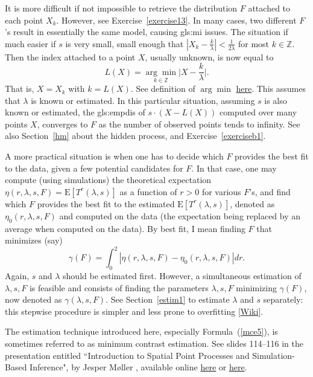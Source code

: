 \documentclass[10pt]{article}
\begin{document}
It is more difficult if not impossible to retrieve the distribution $F$ attached to each point $X_k$. However, see Exercise~\ref{exercise13}. In many cases,
two different $F$'s result in essentially the same model, causing \gls{gls:mi} issues.
The situation if much easier if $s$ is very small, small enough that $|X_k - \frac{k}{\lambda}| < \frac{1}{2\lambda}$ for most $k\in\mathbb{Z}$.
Then the index attached to a point $X$, usually unknown, is now equal to
$$L(X)=\underset{k\in\mathbb{Z}}{\arg\min} \Big|X - \frac{k}{\lambda}\Big|.$$
That is, $X=X_k$ with $k=L(X)$. See definition of $\arg\min$ \href{https://en.wikipedia.org/wiki/Arg_max}{here}. This assumes that $\lambda$ is known or estimated.
In this particular situation, assuming $s$ is also known or estimated, the  \gls{gls:empdis} of $s\cdot (X-L(X))$
computed over many points $X$, converges to $F$ as the number of observed points tends to infinity. See also Section~\ref{hm} about the
\textcolor{index}{hidden process}, and Exercise~\ref{exerciseb1}.

A more practical situation is when one has to decide which $F$ provides the best fit to the data, given a few potential candidates for $F$.  In that case, one may compute (using simulations) the theoretical expectation $\eta(r,\lambda,s, F)=\mbox{E}[T^r(\lambda,s)]$ as a function of $r>0$ for various $F$'s, and find which $F$ provides the best fit to
the estimated $\mbox{E}[T^r(\lambda,s)]$, denoted as  $\eta_0(r,\lambda,s, F)$ and computed on the data (the expectation being replaced by an average when computed on the data). By best fit, I mean finding $F$ that minimizes (say)
\begin{equation}
\gamma(F)=\int_{0}^2 |\eta(r,\lambda,s, F) - \eta_0(r,\lambda,s, F)| dr. \label{mce5}
\end{equation}
\noindent Again, $s$ and $\lambda$ should be estimated first. However, a simultaneous estimation of $\lambda,s,F$ is feasible and consists of finding the parameters
$\lambda,s,F$ minimizing $\gamma(F)$, now denoted as $\gamma(\lambda,s,F)$. See Section~\ref{estim1} to estimate $\lambda$ and $s$ separately: this
stepwise procedure is simpler and less prone to \textcolor{index}{overfitting} [\href{https://en.wikipedia.org/wiki/Overfitting}{Wiki}].

The estimation technique introduced here, especially Formula~(\ref{mce5}),  is sometimes referred to as \textcolor{index}{minimum contrast estimation}.
See slides 114--116 in the presentation entitled ``Introduction to Spatial Point Processes and Simulation-Based Inference",
by Jesper Møller \cite{momo55}, available online \href{https://cimpatogo2018.sciencesconf.org/data/pages/Handout_Moller_CIMPA_Togo_2018.pdf}{here}
 or \href{https://drive.google.com/file/d/1y5TZXvAL8fP9G5UkmV3npKgoVB0YWtXk/view?usp=sharing}{here}.
\end{document}
